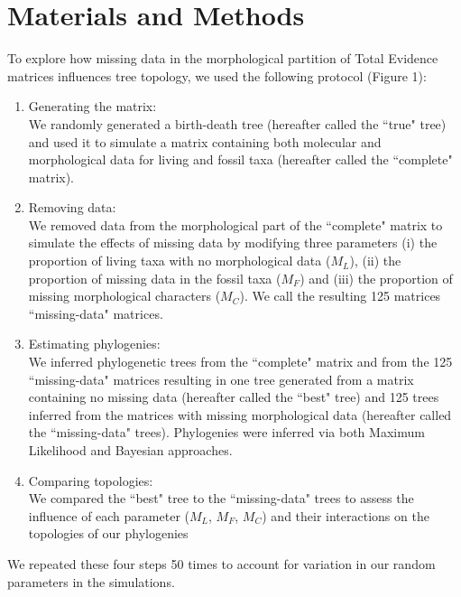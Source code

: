 \documentclass[12pt,letterpaper]{article}
\begin{document}
\section{Materials and Methods}
To explore how missing data in the morphological partition of Total Evidence matrices influences tree topology, we used the following protocol (Figure 1):
\begin{enumerate}
\item{Generating the matrix:} \label{step:generate_matrix} \\
We randomly generated a birth-death tree (hereafter called the ``true" tree) and used it to simulate a matrix containing both molecular and morphological data for living and fossil taxa (hereafter called the ``complete" matrix).
\item{Removing data:} \label{step:remove_data} \\
We removed data from the morphological part of the ``complete" matrix to simulate the effects of missing data by modifying three parameters (i) the proportion of living taxa with no morphological data ($M_{L}$), (ii) the proportion of missing data in the fossil taxa ($M_{F}$) and (iii) the proportion of missing morphological characters ($M_{C}$). We call the resulting 125 matrices ``missing-data" matrices.
\item{Estimating phylogenies:} \label{step:build_phylo} \\
We inferred phylogenetic trees from the ``complete" matrix and from the 125 ``missing-data" matrices resulting in one tree generated from a matrix containing no missing data (hereafter called the ``best" tree) and 125 trees inferred from the matrices with missing morphological data (hereafter called the ``missing-data" trees). Phylogenies were inferred via both Maximum Likelihood and Bayesian approaches.
\item{Comparing topologies:} \label{step:compare_topo} \\
We compared the ``best" tree to the ``missing-data" trees to assess the influence of each parameter ($M_{L}$, $M_{F}$, $M_{C}$) and their interactions on the topologies of our phylogenies
\end{enumerate}
We repeated these four steps 50 times to account for variation in our random parameters in the simulations.

\end{document}
